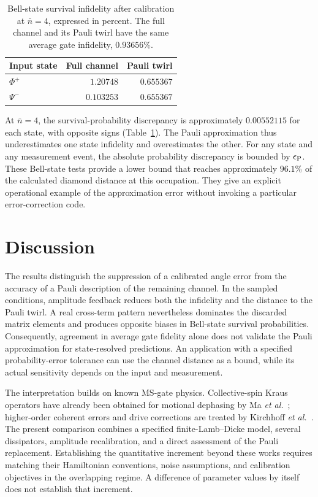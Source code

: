 \documentclass[a4paper,11pt]{article}
\begin{document}
\begin{table}[htbp]
\centering
\caption{Bell-state survival infidelity after calibration at
$\bar n=4$, expressed in percent. The full channel and its Pauli
twirl have the same average gate infidelity, $0.93656\%$.}
\label{tab:bell}
\begin{tabular}{lrr}
\toprule
Input state & Full channel & Pauli twirl\\
\midrule
$\Phi^+$ & $1.20748$ & $0.655367$\\
$\Psi^-$ & $0.103253$ & $0.655367$\\
\bottomrule
\end{tabular}
\end{table}

At $\bar n=4$, the survival-probability discrepancy is approximately
$0.00552115$ for each state, with opposite signs
(Table~\ref{tab:bell}). The Pauli approximation thus underestimates
one state infidelity and overestimates the other. For any state and
any measurement event, the absolute probability discrepancy is
bounded by $\epsilon_{\rm P}$. These Bell-state tests provide a
lower bound that reaches approximately $96.1\%$ of the calculated
diamond distance at this occupation. They give an explicit
operational example of the approximation error without invoking
a particular error-correction code.

\section{Discussion}

The results distinguish the suppression of a calibrated angle error
from the accuracy of a Pauli description of the remaining channel.
In the sampled conditions, amplitude feedback reduces both the
infidelity and the distance to the Pauli twirl. A real cross-term
pattern nevertheless dominates the discarded matrix elements and
produces opposite biases in Bell-state survival probabilities.
Consequently, agreement in average gate fidelity alone does not
validate the Pauli approximation for state-resolved predictions.
An application with a specified probability-error tolerance can
use the channel distance as a bound, while its actual sensitivity
depends on the input and measurement.

The interpretation builds on known MS-gate physics. Collective-spin
Kraus operators have already been obtained for motional dephasing
by Ma \textit{et al.}~\cite{Ma2025}; higher-order coherent errors and
drive corrections are treated by Kirchhoff \textit{et al.}~\cite{Kirchhoff2025}.
The present comparison combines a specified finite-Lamb--Dicke
model, several dissipators, amplitude recalibration, and a direct
assessment of the Pauli replacement. Establishing the quantitative
increment beyond these works requires matching their Hamiltonian
conventions, noise assumptions, and calibration objectives in the
overlapping regime. A difference of parameter values by itself
does not establish that increment.
\end{document}
